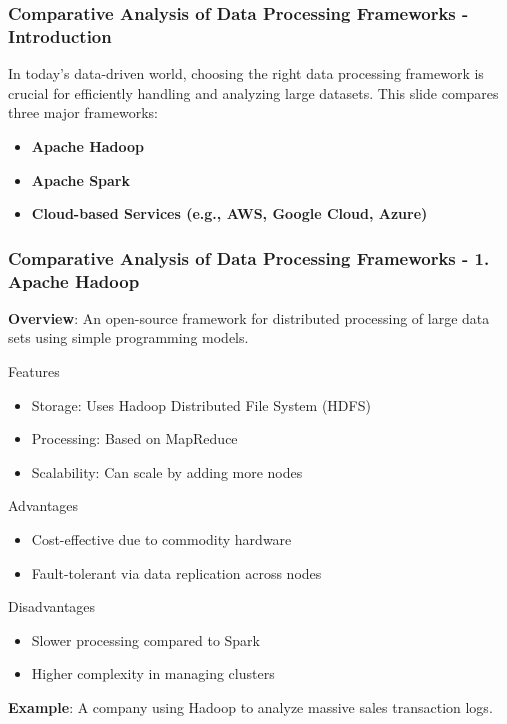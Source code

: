 \documentclass[aspectratio=169]{beamer}
\begin{document}
\begin{frame}[fragile]
    \frametitle{Comparative Analysis of Data Processing Frameworks - Introduction}
    In today's data-driven world, choosing the right data processing framework is crucial for efficiently handling and analyzing large datasets. This slide compares three major frameworks:
    \begin{itemize}
        \item \textbf{Apache Hadoop}
        \item \textbf{Apache Spark}
        \item \textbf{Cloud-based Services (e.g., AWS, Google Cloud, Azure)}
    \end{itemize}
\end{frame}

\begin{frame}[fragile]
    \frametitle{Comparative Analysis of Data Processing Frameworks - 1. Apache Hadoop}
    \textbf{Overview}: An open-source framework for distributed processing of large data sets using simple programming models.

    \begin{block}{Features}
        \begin{itemize}
            \item Storage: Uses Hadoop Distributed File System (HDFS)
            \item Processing: Based on MapReduce
            \item Scalability: Can scale by adding more nodes
        \end{itemize}
    \end{block}
    
    \begin{block}{Advantages}
        \begin{itemize}
            \item Cost-effective due to commodity hardware
            \item Fault-tolerant via data replication across nodes
        \end{itemize}
    \end{block}
    
    \begin{block}{Disadvantages}
        \begin{itemize}
            \item Slower processing compared to Spark
            \item Higher complexity in managing clusters
        \end{itemize}
    \end{block}
    
    \textbf{Example}: A company using Hadoop to analyze massive sales transaction logs.
\end{frame}
\end{document}
